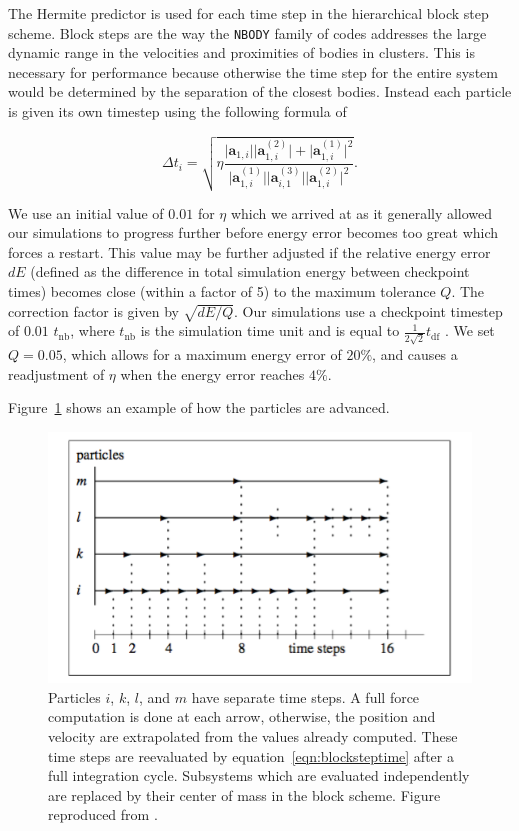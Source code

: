 \documentclass{princeton_astro_thesis}
\numberwithin{equation}{section}
\begin{document}
The Hermite predictor is used for each time step in the hierarchical block step scheme. Block steps are the way the \texttt{NBODY} family of codes addresses the large dynamic range in the velocities and proximities of bodies in clusters. This is necessary for performance because otherwise the time step for the entire system would be determined by the separation of the closest bodies. Instead each particle is given its own timestep using the following formula of \citet{2017Khalisi} 

\begin{equation}
\Delta t_{i} = \sqrt{\eta \frac{\lvert \mathbf{a}_{1,i}\rvert \lvert \mathbf{a}^{(2)}_{1,i}\rvert + \lvert \mathbf{a}^{(1)}_{1,i} \rvert ^2}{\lvert \mathbf{a}^{(1)}_{1,i} \rvert \lvert \mathbf{a}^{(3)}_{i,1} \rvert \lvert \mathbf{a}^{(2)}_{1,i}\rvert^2}}.
\label{eqn:blocksteptime}
\end{equation}

We use an initial value of $0.01$ for $\eta$ which we arrived at as it generally allowed our simulations to progress further before energy error becomes too great which forces a restart.  This value may be further adjusted if the relative energy error $dE$ (defined as the difference in total simulation energy between checkpoint times) becomes close (within a factor of 5) to the maximum tolerance $Q$. The correction factor is given by $\sqrt{dE/Q}$.  Our simulations use a checkpoint timestep of $0.01$ $t_{\mathrm{nb}}$, where $t_{\mathrm{nb}}$ is the simulation time unit and is equal to $\frac{1}{2\sqrt{2}} t_{\mathrm{df}}$ \citep{2017Khalisi}. We set $Q=0.05$, which allows for a maximum energy error of $20\%$, and causes a readjustment of $\eta$ when the energy error reaches $4\%$.

Figure~\ref{fig:blockstep} shows an example of how the particles are advanced. 
\begin{figure}
    \centering
    \includegraphics[width=\textwidth]{KhalisiTimeStep}
    \caption{Particles $i$, $k$, $l$, and $m$ have separate time steps. A full force computation is done at each arrow, otherwise, the position and velocity are extrapolated from the values already computed.  These time steps are reevaluated by equation~\ref{eqn:blocksteptime} after a full integration cycle. Subsystems which are evaluated independently are replaced by their center of mass in the block scheme. Figure reproduced from \citet{2017Khalisi}.}
    \label{fig:blockstep}
\end{figure}
\end{document}
